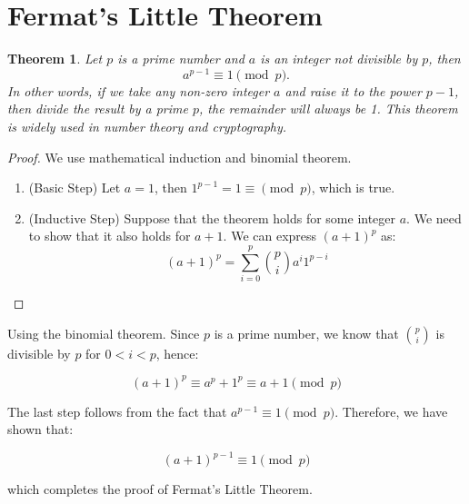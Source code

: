 \documentclass[12pt,openany]{book}
\newtheorem{theorem}{Theorem}[chapter]
\theoremstyle{definition}
\newcommand{\of}[1]{\left( #1 \right)}
\begin{document}
	\section{Fermat's Little Theorem}
	
	\begin{tcolorbox}[title=Fermat's Little Theorem]
		\begin{theorem}
			Let $p$ is a prime number and $a$ is an integer not divisible by $p$, then \[
			a^{p-1}\equiv1 \pmod{p}.
			\] In other words, if we take any non-zero integer $a$ and raise it to the power $p-1$, then divide the result by a prime $p$, the remainder will always be 1. This theorem is widely used in number theory and cryptography.
		\end{theorem}
	\end{tcolorbox}
	\begin{proof}
		We use mathematical induction and binomial theorem. \begin{enumerate}
			\item (Basic Step) Let $a=1$, then $1^{p-1}=1\equiv\pmod{p}$, which is true.
			\item (Inductive Step) Suppose that the theorem holds for some integer $a$. We need to show that it also holds for $a+1$. We can express $(a+1)^{p}$ as: \[
			\of{a+1}^p=\sum_{i=0}^{p}\binom{p}{i}a^{i} 1^{p-i}
			\]
		\end{enumerate}
	\end{proof}
	Using the binomial theorem. Since $p$ is a prime number, we know that $\binom{p}{i}$ is divisible by $p$ for $0<i<p$, hence:
	
	$$(a+1)^{p} \equiv a^{p} + 1^{p} \equiv a + 1 \pmod{p}$$
	
	The last step follows from the fact that $a^{p-1} \equiv 1 \pmod{p}$. Therefore, we have shown that:
	
	$$(a+1)^{p-1} \equiv 1 \pmod{p}$$
	
	which completes the proof of Fermat's Little Theorem.
	
\end{document}
